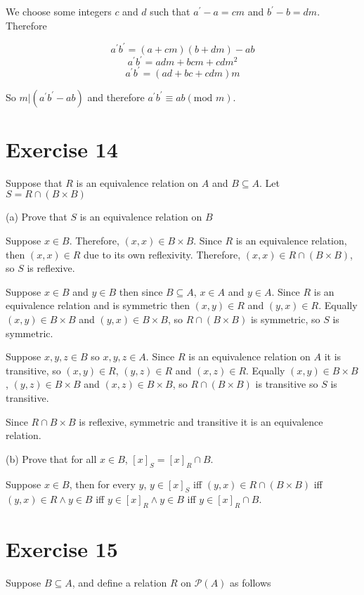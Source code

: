 \documentclass[11pt]{article}
\newcommand{\powerset}[1]{\mathscr{P}(#1)}
\begin{document}
We choose some integers $c$ and $d$ such that $a^\prime - a = cm$ and 
$b^\prime - b = dm$. Therefore

$$a^\prime b^\prime = (a + cm)(b + dm) - ab$$
$$a^\prime b^\prime = adm + bcm + cdm^2$$
$$a^\prime b^\prime = (ad + bc + cdm)m$$

So $m | (a^\prime b^\prime -ab)$ and therefore $a^\prime b^\prime \equiv ab (\text{mod } m)$.

\section*{Exercise 14}

Suppose that $R$ is an equivalence relation on $A$ and $B \subseteq A$. Let 
$S = R \cap (B \times B)$

\noindent (a) Prove that $S$ is an equivalence relation on $B$

Suppose $x \in B$. Therefore, $(x, x) \in B \times B$. Since $R$ is an equivalence
relation, then $(x,x) \in R$ due to its own reflexivity. Therefore,
$(x,x) \in R \cap (B \times B)$, so $S$ is reflexive.

Suppose $x \in B$ and $y \in B$ then since $B \subseteq A$, $x \in A$ and $y \in A$.
Since $R$ is an equivalence relation and is symmetric then $(x,y) \in R$ and 
$(y,x) \in R$. Equally $(x,y) \in B \times B$ and $(y,x) \in B \times B$, so 
$R \cap (B \times B)$ is symmetric, so $S$ is symmetric.

Suppose $x,y,z \in B$ so $x,y,z \in A$. Since $R$ is an equivalence relation 
on $A$ it is transitive, so $(x,y) \in R$, $(y,z) \in R$ and $(x,z) \in R$.
Equally $(x,y) \in B \times B$, $(y,z) \in B \times B$ and $(x,z) \in B \times B$,
so $R \cap (B \times B)$ is transitive so $S$ is transitive.

Since $R \cap B \times B$ is reflexive, symmetric and transitive it is an 
equivalence relation.

\noindent (b) Prove that for all $x \in B$, $[x]_S = [x]_R \cap B$.

Suppose $x \in B$, then for every $y$, 
$y \in [x]_S$ iff 
$(y,x) \in R \cap (B \times B)$ iff 
$(y,x) \in R \wedge y \in B$ iff 
$y \in [x]_R \wedge y \in B$ iff
$y \in [x]_R \cap B$.

\section*{Exercise 15}

Suppose $B \subseteq A$, and define a relation $R$ on $\powerset{A}$ as follows
\end{document}
